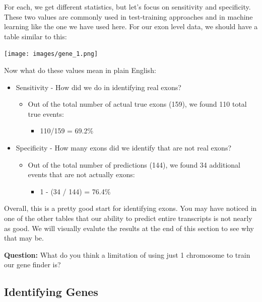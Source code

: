 \documentclass[11pt]{article}
\providecommand{\tightlist}{%
      \setlength{\itemsep}{0pt}\setlength{\parskip}{0pt}}
\begin{document}
For each, we get different statistics, but let's focus on sensitivity
and specificity. These two values are commonly used in test-training
approaches and in machine learning like the one we have used here. For
our exon level data, we should have a table similar to this:

\texttt{[image: images/gene\_1.png]}

Now what do these values mean in plain English:

\begin{itemize}
\tightlist
\item
  Sensitivity - How did we do in identifying real exons?

  \begin{itemize}
  \tightlist
  \item
    Out of the total number of actual true exons (159), we found 110
    total true events:

    \begin{itemize}
    \tightlist
    \item
      110/159 = 69.2\%
    \end{itemize}
  \end{itemize}
\item
  Specificity - How many exons did we identify that are not real exons?

  \begin{itemize}
  \tightlist
  \item
    Out of the total number of predictions (144), we found 34 additional
    events that are not actually exons:

    \begin{itemize}
    \tightlist
    \item
      1 - (34 / 144) = 76.4\%
    \end{itemize}
  \end{itemize}
\end{itemize}

Overall, this is a pretty good start for identifying exons. You may have
noticed in one of the other tables that our ability to predict entire
transcripts is not nearly as good. We will visually evalute the results
at the end of this section to see why that may be.

\textbf{Question:} What do you think a limitation of using just 1
chromosome to train our gene finder is?

    \hypertarget{identifying-genes}{%
\subsection{Identifying Genes}\label{identifying-genes}}
\end{document}
